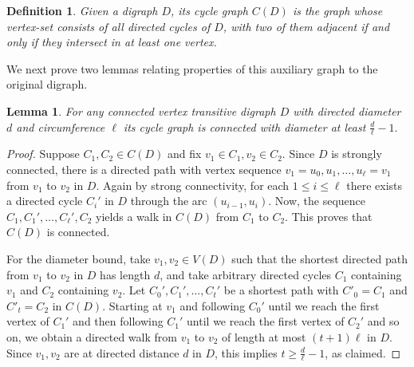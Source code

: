 \documentclass[english,11pt]{article}
\newtheorem{lemma}[theorem]{Lemma}
\newtheorem{definition}[theorem]{Definition}
\theoremstyle{definition}
\numberwithin{equation}{section}
\numberwithin{figure}{section}
\begin{document}
\begin{definition}\label{defn:cycle-graph}
Given a digraph $D$, its \emph{cycle graph} $C(D)$ is the graph whose vertex-set consists of all directed cycles of $D$, with two of them adjacent if and only if they intersect in at least one vertex.
\end{definition}

We next prove two lemmas relating properties of this auxiliary graph to the original digraph.

\begin{lemma}\label{lem:diameter-in-cycle-graph}
For any connected vertex transitive digraph $D$ with directed diameter $d$ and circumference $\ell$ its cycle graph is connected with diameter at least $\frac{d}{\ell}-1.$
\end{lemma}
\begin{proof}
Suppose $C_1, C_2 \in C(D)$ and fix $v_1\in C_1, v_2 \in C_2$. Since $D$ is strongly connected, there is a directed path with vertex sequence $v_1=u_0,u_1,\ldots,u_\ell=v_1$ from $v_1$ to $v_2$ in $D$. Again by strong connectivity, for each $1\le i \le\ell$ there exists a directed cycle $C_i'$ in $D$ through the arc $(u_{i-1},u_i)$. Now, the sequence $C_1,C_1',\ldots,C_\ell',C_2$ yields a walk in $C(D)$ from $C_1$ to $C_2$. This proves that $C(D)$ is connected. 

For the diameter bound, take $v_1,v_2 \in V(D)$ such that the shortest directed path from $v_1$ to $v_2$ in $D$ has length $d$, and take arbitrary directed cycles $C_1$ containing $v_1$ and $C_2$ containing $v_2$. Let $C_0',C_1',\ldots, C_{t}'$ be a shortest path with $C'_0=C_1$ and $C'_t=C_2$ in $C(D)$. Starting at $v_1$ and following $C_0'$ until we reach the first vertex of $C_1'$ and then following $C_1'$ until we reach the first vertex of $C_2'$ and so on, we obtain a directed walk from $v_1$ to $v_2$ of length at most $(t+1) \ell$ in $D$. Since $v_1,v_2$ are at directed distance $d$ in $D$, this implies $t \ge \frac{d}{\ell}-1$, as claimed.
\end{proof}
\end{document}
